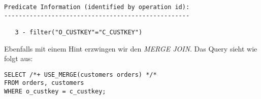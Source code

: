 \documentclass[11pt,a4paper,parskip=half]{scrartcl}
\begin{document}
\begin{lstlisting}
Predicate Information (identified by operation id):                                                                                                                                                                                                                                                          
---------------------------------------------------                                                                                                                                                                                                                                                          
                                                                                                                                                                                                                                                                                                             
   3 - filter("O_CUSTKEY"="C_CUSTKEY")                                                                                                                                                                                                                                                                       
\end{lstlisting}

Ebenfalls mit einem Hint erzwingen wir den \emph{MERGE JOIN}. Das Query sieht wie folgt aus:
\begin{lstlisting}
SELECT /*+ USE_MERGE(customers orders) */* 
FROM orders, customers
WHERE o_custkey = c_custkey;
\end{lstlisting}
\end{document}
